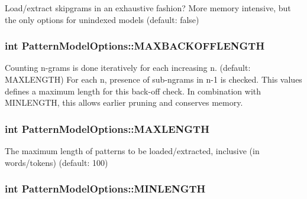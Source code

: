 Load/extract skipgrams in an exhaustive fashion? More memory intensive, but the only options for unindexed models (default\+: false) 

\hypertarget{classPatternModelOptions_a9154b55890ee1ff5d9ec43741a0e3908}{}
\subsubsection[{M\+A\+X\+B\+A\+C\+K\+O\+F\+F\+L\+E\+N\+G\+T\+H}]{\setlength{\rightskip}{0pt plus 5cm}int Pattern\+Model\+Options\+::\+M\+A\+X\+B\+A\+C\+K\+O\+F\+F\+L\+E\+N\+G\+T\+H}\label{classPatternModelOptions_a9154b55890ee1ff5d9ec43741a0e3908}
Counting n-\/grams is done iteratively for each increasing n. (default\+: M\+A\+X\+L\+E\+N\+G\+T\+H) For each n, presence of sub-\/ngrams in n-\/1 is checked. This values defines a maximum length for this back-\/off check. In combination with M\+I\+N\+L\+E\+N\+G\+T\+H, this allows earlier pruning and conserves memory. \hypertarget{classPatternModelOptions_a7630da974c460ec2d67c2ed9f4c84144}{}
\subsubsection[{M\+A\+X\+L\+E\+N\+G\+T\+H}]{\setlength{\rightskip}{0pt plus 5cm}int Pattern\+Model\+Options\+::\+M\+A\+X\+L\+E\+N\+G\+T\+H}\label{classPatternModelOptions_a7630da974c460ec2d67c2ed9f4c84144}


The maximum length of patterns to be loaded/extracted, inclusive (in words/tokens) (default\+: 100) 

\hypertarget{classPatternModelOptions_a4dada20f1bba3cc5e08a49e4a9bfb545}{}
\subsubsection[{M\+I\+N\+L\+E\+N\+G\+T\+H}]{\setlength{\rightskip}{0pt plus 5cm}int Pattern\+Model\+Options\+::\+M\+I\+N\+L\+E\+N\+G\+T\+H}\label{classPatternModelOptions_a4dada20f1bba3cc5e08a49e4a9bfb545}


